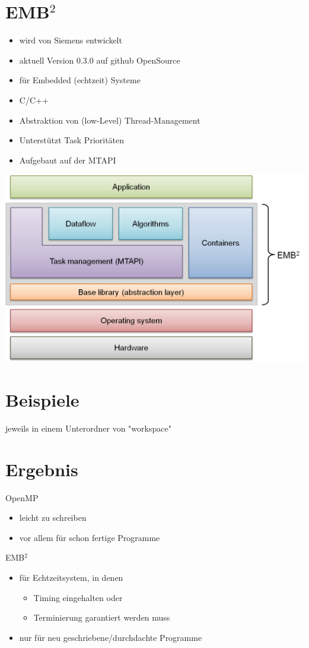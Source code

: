 \documentclass[a4paper,11pt,DIV=11]{article} %
\begin{document}
\section{EMB$ ^2$}
\begin{itemize}
	\item wird von Siemens entwickelt 
	\item aktuell Version 0.3.0 auf github OpenSource
	\item für Embedded (echtzeit) Systeme
	\item C/C++
	\item Abstraktion von (low-Level) Thread-Management
	\item Unterstützt Task Prioritäten
	\item Aufgebaut auf der MTAPI
\end{itemize}
\includegraphics[width=\textwidth]{img/embb.png}
\section{Beispiele}
jeweils in einem Unterordner von "workspace"
\section{Ergebnis}
OpenMP
\begin{itemize}
	\item leicht zu schreiben
	\item vor allem für schon fertige Programme
\end{itemize}
EMB$ ^2$
\begin{itemize}
	\item für Echtzeitsystem, in denen 
	\begin{itemize}
		\item Timing eingehalten oder 
		\item Terminierung garantiert werden muss
	\end{itemize}	 	
	\item nur für neu geschriebene/durchdachte Programme
\end{itemize}
\end{document}
